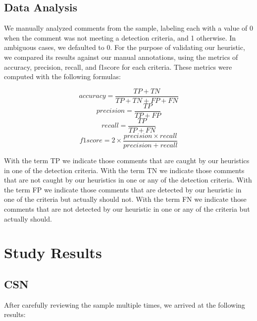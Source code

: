 \subsection{Data Analysis}
We manually analyzed comments from the sample, labeling each with a value of 0 when the comment was not meeting a detection criteria, and 1 otherwise. In ambiguous cases, we defaulted to 0.
For the purpose of validating our heuristic, we compared its results against our manual annotations, using the metrics of accuracy, precision, recall, and f1score for each criteria. These metrics were computed with the following formulas:

\begin{equation*}
	accuracy = \frac{TP + TN}{TP + TN + FP + FN}		
\end{equation*}
\begin{equation*}
	precision = \frac{TP}{TP + FP}
\end{equation*}
\begin{equation*}
	recall = \frac{TP}{TP + FN}
\end{equation*}
\begin{equation*}
	f1score = 2 \times \frac{precision \times recall}{precision + recall}
\end{equation*}

\noindent With the term TP we indicate those comments that are caught by our heuristics in one of the detection criteria. With the term TN we indicate those comments that are not caught by our heuristics in one or any of the detection criteria. With the term FP we indicate those comments that are detected by our heuristic in one of the criteria but actually should not. With the term FN we indicate those comments that are not detected by our heuristic in one or any of the criteria but actually should.

\section{Study Results}
\subsection{CSN}
After carefully reviewing the sample multiple times, we arrived at the following results:


